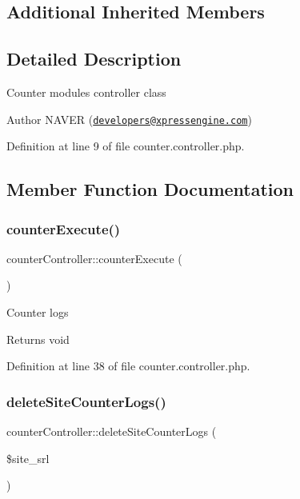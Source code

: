 \subsection*{Additional Inherited Members}


\subsection{Detailed Description}
Counter module\textquotesingle{}s controller class

\begin{DoxyAuthor}{Author}
N\+A\+V\+ER (\href{mailto:developers@xpressengine.com}{\tt developers@xpressengine.\+com}) 
\end{DoxyAuthor}


Definition at line 9 of file counter.\+controller.\+php.



\subsection{Member Function Documentation}
\hypertarget{classcounterController_ad088e584257571fffd0ea9153c676a7f}{}\label{classcounterController_ad088e584257571fffd0ea9153c676a7f} 
\subsubsection{\texorpdfstring{counter\+Execute()}{counterExecute()}}
{\footnotesize\ttfamily counter\+Controller\+::counter\+Execute (\begin{DoxyParamCaption}{ }\end{DoxyParamCaption})}

Counter logs

\begin{DoxyReturn}{Returns}
void 
\end{DoxyReturn}


Definition at line 38 of file counter.\+controller.\+php.

\hypertarget{classcounterController_a27eebacfe75ed149166d010af2320faf}{}\label{classcounterController_a27eebacfe75ed149166d010af2320faf} 
\subsubsection{\texorpdfstring{delete\+Site\+Counter\+Logs()}{deleteSiteCounterLogs()}}
{\footnotesize\ttfamily counter\+Controller\+::delete\+Site\+Counter\+Logs (\begin{DoxyParamCaption}\item[{}]{\$site\+\_\+srl }\end{DoxyParamCaption})}

